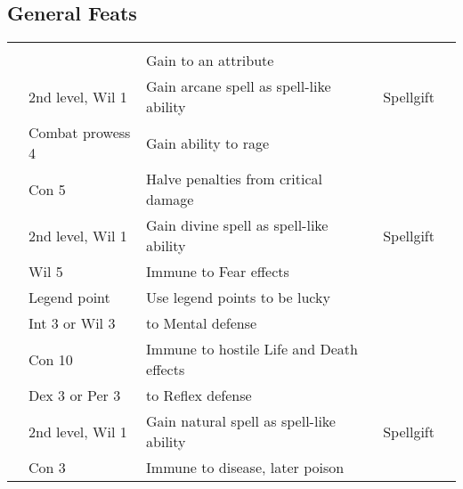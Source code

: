 \subsection{General Feats}
\begin{longtabuwrapper}
    \begin{longtabu}{>{\lcol}p{10em} >{\lcol}p{15em} >{\lcol}X >{\lcol}p{8em} >{\lcol}p{3em}}
         &  &  &  &  \\
         & \x & Gain  to an attribute           & \x &  \\
         & 2nd level, Wil 1 & Gain arcane spell as spell-like ability & Spellgift &  \\
         & Combat prowess 4 & Gain ability to rage & \x &  \\
         & Con 5 & Halve penalties from critical damage         & \x &  \\
         & 2nd level, Wil 1 & Gain divine spell as spell-like ability & Spellgift &  \\
         & Wil 5 & Immune to Fear effects                      & \x &  \\
         & Legend point & Use legend points to be lucky  & \x &  \\
         & Int 3 or Wil 3 &  to Mental defense           & \x &  \\
         & Con 10 & Immune to hostile Life and Death effects   & \x &  \\
         & Dex 3 or Per 3 &   to Reflex defense & \x &  \\
         & 2nd level, Wil 1 & Gain natural spell as spell-like ability & Spellgift &  \\
         & Con 3 & Immune to disease, later poison        & \x &  \\

\end{longtabu}
\end{longtabuwrapper}
